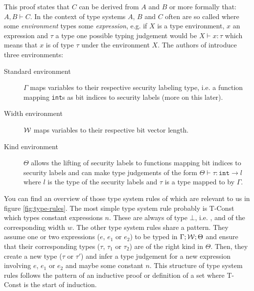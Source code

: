 This proof states that $ C $ can be derived from $ A $ and $ B $ or more formally that: $ A, B \vdash C $.
In the context of type systems $ A $, $ B $ and $ C $ often are so called  where some \textit{environment} types some \textit{expression}, e.g. if $ X $ is a type environment, $ x $ an expression and $ \tau $ a type one possible typing judgement would be $ X \vdash x : \tau $ which means that $ x $ is of type $ \tau $ under the environment $ X $.
The authors of \cite{Ferraiuolo17} introduce three environments:

\begin{description}
    \item[Standard environment] $ \Gamma $ maps variables to their respective security labeling type, i.e. a function mapping \texttt{int}s as bit indices to security labels (more on this later).
    \item[Width environment] $ \mathcal{W} $ maps variables to their respective bit vector length.
    \item[Kind environment] $ \Theta $ allows the lifting of security labels to functions mapping bit indices to security labels and can make type judgements of the form $ \Theta \vdash \tau : \texttt{int} \rightarrow l $ where $ l $ is the type of the security labels and $ \tau $ is a type mapped to by $ \Gamma $.
\end{description}

You can find an overview of those type system rules of \cite{Ferraiuolo17} which are relevant to us in figure \ref{fig:type-rules}.
The most simple type system rule probably is T-Const which types constant expressions $ n $.
These are always of type $ \bot $, i.e. \PT, and of the corresponding width $ w $.
The other type system rules share a pattern.
They assume one or two expressions ($ e $, $ e_1 $ or $ e_2 $) to be typed in $ \Gamma; \mathcal{W}; \Theta $ and ensure that their corresponding types ($ \tau $, $ \tau_1 $ or $ \tau_2 $) are of the right kind in $ \Theta $.
Then, they create a new type ($ \tau $ or $ \tau' $) and infer a type judgement for a new expression involving $ e $, $ e_1 $ or $ e_2 $ and maybe some constant $ n $.
This structure of type system rules follows the pattern of an inductive proof or definition of a set where T-Const is the start of induction.

